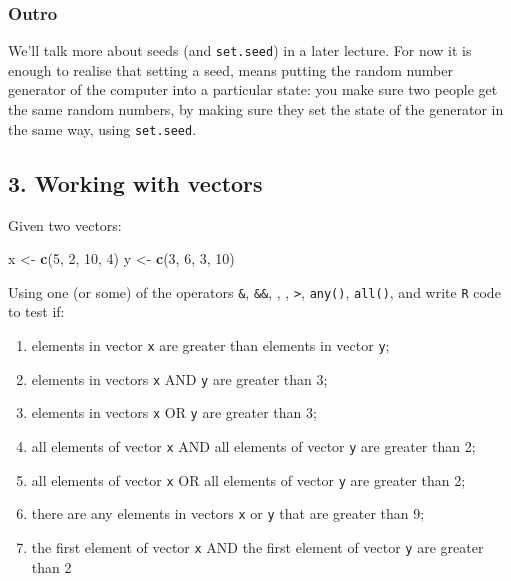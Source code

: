 \documentclass[]{article}
\newenvironment{Shaded}{\begin{snugshade}}{\end{snugshade}}
\newcommand{\DecValTok}[1]{\textcolor[rgb]{0.00,0.00,0.81}{#1}}
\newcommand{\KeywordTok}[1]{\textcolor[rgb]{0.13,0.29,0.53}{\textbf{#1}}}
\newcommand{\NormalTok}[1]{#1}
\newcommand{\StringTok}[1]{\textcolor[rgb]{0.31,0.60,0.02}{#1}}
\providecommand{\tightlist}{%
  \setlength{\itemsep}{0pt}\setlength{\parskip}{0pt}}
\begin{document}
\hypertarget{outro}{%
\subsubsection{Outro}\label{outro}}

We'll talk more about seeds (and \texttt{set.seed}) in a later lecture.
For now it is enough to realise that setting a seed, means putting the
random number generator of the computer into a particular state: you
make sure two people get the same random numbers, by making sure they
set the state of the generator in the same way, using \texttt{set.seed}.

\hypertarget{working-with-vectors}{%
\subsection{3. Working with vectors}\label{working-with-vectors}}

Given two vectors:

\begin{Shaded}
\begin{Highlighting}[]
\NormalTok{x <-}\StringTok{ }\KeywordTok{c}\NormalTok{(}\DecValTok{5}\NormalTok{, }\DecValTok{2}\NormalTok{, }\DecValTok{10}\NormalTok{, }\DecValTok{4}\NormalTok{) }
\NormalTok{y <-}\StringTok{ }\KeywordTok{c}\NormalTok{(}\DecValTok{3}\NormalTok{, }\DecValTok{6}\NormalTok{, }\DecValTok{3}\NormalTok{, }\DecValTok{10}\NormalTok{)}
\end{Highlighting}
\end{Shaded}

Using one (or some) of the operators \texttt{\&}, \texttt{\&\&},
\texttt{\textbar{}}, \texttt{\textbar{}\textbar{}},
\texttt{\textgreater{}}, \texttt{any()}, \texttt{all()}, and write
\texttt{R} code to test if:

\begin{enumerate}
\def\labelenumi{\alph{enumi}.}
\tightlist
\item
  elements in vector \texttt{x} are greater than elements in vector
  \texttt{y};\\
\item
  elements in vectors \texttt{x} AND \texttt{y} are greater than 3;\\
\item
  elements in vectors \texttt{x} OR \texttt{y} are greater than 3;\\
\item
  all elements of vector \texttt{x} AND all elements of vector
  \texttt{y} are greater than 2;\\
\item
  all elements of vector \texttt{x} OR all elements of vector \texttt{y}
  are greater than 2;\\
\item
  there are any elements in vectors \texttt{x} or \texttt{y} that are
  greater than 9;\\
\item
  the first element of vector \texttt{x} AND the first element of vector
  \texttt{y} are greater than 2
\end{enumerate}
\end{document}
